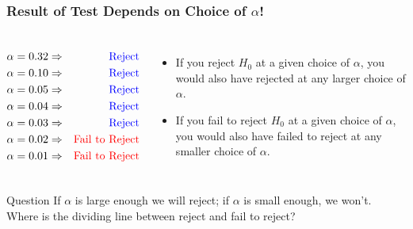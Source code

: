 \begin{frame}
  \frametitle{Result of Test Depends on Choice of $\alpha$!}

  \begin{columns}
    \footnotesize
  \begin{eqnarray*}
    \alpha = 0.32 &\Rightarrow& \mbox{\textcolor{blue}{Reject}}\\ 
    \alpha = 0.10 &\Rightarrow& \mbox{\textcolor{blue}{Reject}}\\
    \alpha = 0.05 &\Rightarrow& \mbox{\textcolor{blue}{Reject}}\\ 
    \alpha = 0.04 &\Rightarrow& \mbox{\textcolor{blue}{Reject}}\\
    \alpha = 0.03 &\Rightarrow& \mbox{\textcolor{blue}{Reject}}\\
    \alpha = 0.02 &\Rightarrow& \mbox{\textcolor{red}{Fail to Reject}}\\
    \alpha = 0.01 &\Rightarrow& \mbox{\textcolor{red}{Fail to Reject}}
  \end{eqnarray*}
    

    \begin{itemize}
      \item If you reject $H_0$ at a given choice of $\alpha$, you would also have rejected at any \alert{larger} choice of $\alpha$.\pause
      \item If you fail to reject $H_0$ at a given choice of $\alpha$, you would also have failed to reject at any \alert{smaller} choice of $\alpha$.
    \end{itemize}
    
  \end{columns}

  \vspace{1em}

  \pause

  \begin{block}{Question}
   If $\alpha$ is large enough we will reject; if $\alpha$ is small enough, we won't.
   Where is the \alert{dividing line} between reject and fail to reject?
  \end{block}

  
\end{frame}
